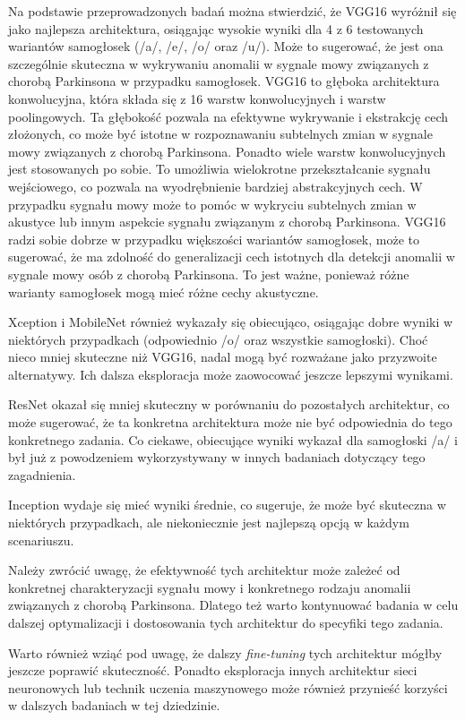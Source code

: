 Na podstawie przeprowadzonych badań można stwierdzić, że VGG16 wyróżnił się jako najlepsza architektura, osiągając wysokie wyniki dla 4 z 6 testowanych wariantów samogłosek (/a/, /e/, /o/ oraz /u/).
Może to sugerować, że jest ona szczególnie skuteczna w wykrywaniu anomalii w sygnale mowy związanych z chorobą Parkinsona w przypadku samogłosek.
VGG16 to głęboka architektura konwolucyjna, która składa się z 16 warstw konwolucyjnych i warstw poolingowych.
Ta głębokość pozwala na efektywne wykrywanie i ekstrakcję cech złożonych, co może być istotne w rozpoznawaniu subtelnych zmian w sygnale mowy związanych z chorobą Parkinsona.
Ponadto wiele warstw konwolucyjnych jest stosowanych po sobie.
To umożliwia wielokrotne przekształcanie sygnału wejściowego, co pozwala na wyodrębnienie bardziej abstrakcyjnych cech.
W przypadku sygnału mowy może to pomóc w wykryciu subtelnych zmian w akustyce lub innym aspekcie sygnału związanym z chorobą Parkinsona.
VGG16 radzi sobie dobrze w przypadku większości wariantów samogłosek, może to sugerować, że ma zdolność do generalizacji cech istotnych dla detekcji anomalii w sygnale mowy osób z chorobą Parkinsona.
To jest ważne, ponieważ różne warianty samogłosek mogą mieć różne cechy akustyczne.

Xception i MobileNet również wykazały się obiecująco, osiągając dobre wyniki w niektórych przypadkach (odpowiednio /o/ oraz wszystkie samogłoski).
Choć nieco mniej skuteczne niż VGG16, nadal mogą być rozważane jako przyzwoite alternatywy.
Ich dalsza eksploracja może zaowocować jeszcze lepszymi wynikami.

ResNet okazał się mniej skuteczny w porównaniu do pozostałych architektur, co może sugerować, że ta konkretna architektura może nie być odpowiednia do tego konkretnego zadania.
Co ciekawe, obiecujące wyniki wykazał dla samogłoski /a/ i był już  z powodzeniem wykorzystywany w innych badaniach dotyczący tego zagadnienia.

Inception wydaje się mieć wyniki średnie, co sugeruje, że może być skuteczna w niektórych przypadkach, ale niekoniecznie jest najlepszą opcją w każdym scenariuszu.

Należy zwrócić uwagę, że efektywność tych architektur może zależeć od konkretnej charakteryzacji sygnału mowy i konkretnego rodzaju anomalii związanych z chorobą Parkinsona.
Dlatego też warto kontynuować badania w celu dalszej optymalizacji i dostosowania tych architektur do specyfiki tego zadania.

Warto również wziąć pod uwagę, że dalszy \emph{fine-tuning}  tych architektur mógłby jeszcze poprawić skuteczność.
Ponadto eksploracja innych architektur sieci neuronowych lub technik uczenia maszynowego może również przynieść korzyści w dalszych badaniach w tej dziedzinie.


